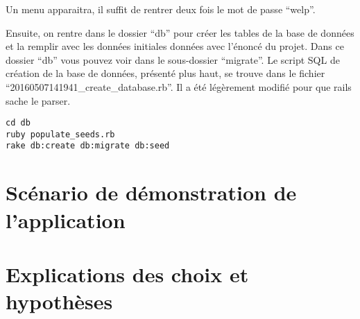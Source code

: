 \documentclass[a4paper,10pt]{article}
\begin{document}
Un menu apparaitra, il suffit de rentrer deux fois le mot de passe ``welp''.

Ensuite, on rentre dans le dossier ``db'' pour créer les tables de la base de données et la remplir avec les données initiales données avec l'énoncé du projet. Dans ce dossier ``db'' vous pouvez voir dans le sous-dossier ``migrate''. Le script SQL de création de la base de données, présenté plus haut, se trouve dans le fichier ``20160507141941\_create\_database.rb''. Il a été légèrement modifié pour que rails sache le parser.

\begin{verbatim}
cd db
ruby populate_seeds.rb
rake db:create db:migrate db:seed
\end{verbatim}

\section{Scénario de démonstration de l'application}

\section{Explications des choix et hypothèses}
\end{document}
